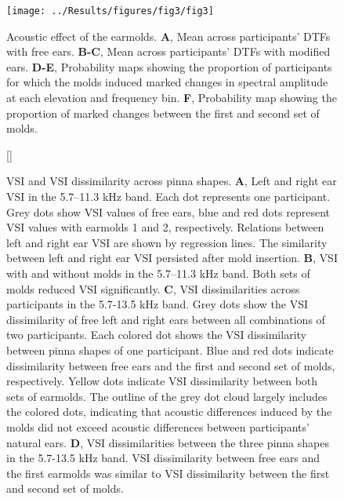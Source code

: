 \begin{figure}[h]
\centering
	\centerline{\texttt{[image: ../Results/figures/fig3/fig3]}}
	\caption{Acoustic effect of the earmolds. \textbf{A}, Mean across participants' DTFs with free ears. \textbf{B-C}, Mean across participants' DTFs with modified ears. \textbf{D-E}, Probability maps showing the proportion of participants for which the molds induced marked changes in spectral amplitude at each elevation and frequency bin. \textbf{F}, Probability map showing the proportion of marked changes between the first and second set of molds.}
        \label{fig:spectral_change}
\end{figure}

\begin{figure}[t]
[\FBwidth]
{\caption{VSI and VSI dissimilarity across pinna shapes. \textbf{A}, Left and right ear VSI in the 5.7–11.3 kHz band. Each dot represents one participant. Grey dots show VSI values of free ears, blue and red dots represent VSI values with earmolds 1 and 2, respectively. Relations between left and right ear VSI are shown by regression lines. The similarity between left and right ear VSI persisted after mold insertion. \textbf{B}, VSI with and without molds in the 5.7–11.3 kHz band. Both sets of molds reduced VSI significantly. \textbf{C}, VSI dissimilarities across participants in the 5.7-13.5 kHz band. Grey dots show the VSI dissimilarity of free left and right ears between all combinations of two participants. Each colored dot shows the VSI dissimilarity between pinna shapes of one participant. Blue and red dots indicate dissimilarity between free ears and the first and second set of molds, respectively. Yellow dots indicate VSI dissimilarity between both sets of earmolds. The outline of the grey dot cloud largely includes the colored dots, indicating that acoustic differences induced by the molds did not exceed acoustic differences between participants' natural ears. \textbf{D}, VSI dissimilarities between the three pinna shapes in the 5.7-13.5 kHz band. VSI dissimilarity between free ears and the first earmolds was similar to VSI dissimilarity between the first and second set of molds.}
\label{fig:molds_vsi}}

\end{figure}
